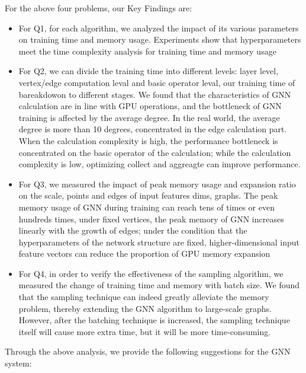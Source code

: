 For the above four problems, our Key Findings are:
\begin{itemize}
    \item For Q1, for each algorithm, we analyzed the impact of its various parameters on training time and memory usage. 
    Experiments show that hyperparameters meet the time complexity analysis for training time and memory usage 
    \item For Q2, we can divide the training time into different levels: layer level, vertex/edge computation leval 
    and basic operator leval, our training time of bareakdowon to different stages. We found that the characteristics of GNN
    calculation are in line with GPU operations, and the bottleneck of GNN training is affected by the average degree.
    In the real world, the average degree is more than 10 degrees, concentrated in the edge calculation part. 
    When the calculation complexity is high, the performance bottleneck is concentrated on the basic operator of the calculation; 
    while the calculation complexity is low, optimizing collect and aggreagte can improve performance.
    \item For Q3, we measured the impact of peak memory usage and expansion ratio on the scale, points and edges of input features dims, graphs. 
    The peak memory usage of GNN during training can reach tens of times or even hundreds times, under fixed vertices, 
    the peak memory of GNN increases linearly with the growth of edges;
    under the condition that the hyperparameters of the network structure are fixed, 
    higher-dimensional input feature vectors can reduce the proportion of GPU memory expansion 
    \item For Q4, in order to verify the effectiveness of the sampling algorithm, we measured the change of training time
    and memory with batch size. 
    We found that the sampling technique can indeed greatly alleviate the memory problem, 
    thereby extending the GNN algorithm to large-scale graphs. However, after the batching technique is increased, 
    the sampling technique itself will cause more extra time, but it will be more time-consuming.
\end{itemize}

Through the above analysis, we provide the following suggestions for the GNN system:

